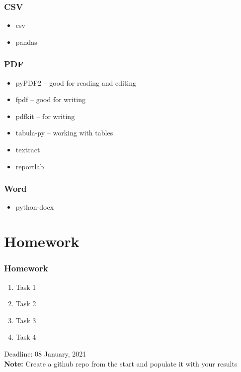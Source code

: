 \documentclass{beamer}
\begin{document}
\begin{frame}
    \frametitle{CSV}
            \begin{itemize}
                \item csv
                \item pandas
            \end{itemize}
\end{frame}

\begin{frame}
    \frametitle{PDF}
            \begin{itemize}
                \item pyPDF2 – good for reading and editing
                \item fpdf – good for writing
                \item pdfkit – for writing
                \item tabula-py – working with tables
                \item textract
                \item reportlab
            \end{itemize}
\end{frame}

\begin{frame}
    \frametitle{Word}
            \begin{itemize}
                \item python-docx                
            \end{itemize}
\end{frame}

\section{Homework} 

\begin{frame}
    \frametitle{Homework}
    \begin{enumerate}
        \item Task 1
        \item Task 2
        \item Task 3
        \item Task 4
    \end{enumerate}

\vskip 2mm
Deadline: 08 January, 2021 \\

\vfill
\textbf{Note:} Create a github repo from the start and populate it with your results
\end{frame}
\end{document}
